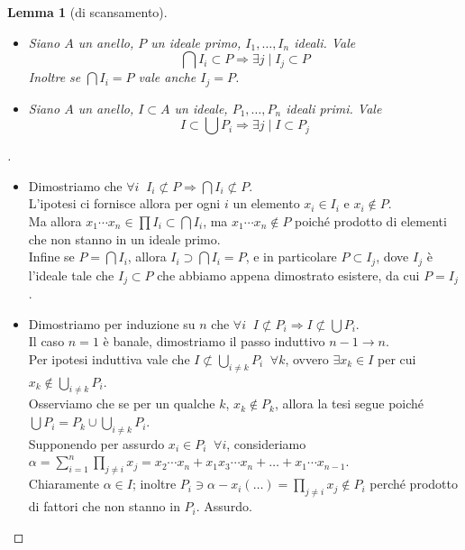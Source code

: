 \documentclass[a4paper,10pt]{article}
\theoremstyle{plain}
\newtheorem{lemma}[thm]{Lemma}
\theoremstyle{definition}
\newenvironment{myproof}[1][\proofname]{%
  \begin{proof}[#1]$ $\par\nobreak\ignorespaces
}{%
  \qedhere
  \end{proof}
}
\begin{document}
\begin{lemma}[di scansamento]
    $ $
    \begin{itemize}
        \item[a)] Siano $A$ un anello, $P$ un ideale primo, $I_1,\dots,I_n$ ideali. Vale $$\bigcap I_i\subset P\Longrightarrow\exists j\;|\;I_j\subset P$$ Inoltre se $\bigcap I_i=P$ vale anche $I_j=P$.
        \item[b)] Siano $A$ un anello, $I\subset A$ un ideale, $P_1,\dots,P_n$ ideali primi. Vale $$I\subset\bigcup P_i\Longrightarrow\exists j\;|\; I\subset P_j$$
    \end{itemize}
\end{lemma}
\begin{myproof}
    \begin{itemize}
        \item[a)] Dimostriamo che $\forall i\;\; I_i\not\subset P\Longrightarrow\bigcap I_i\not\subset P$.\\
        L'ipotesi ci fornisce allora per ogni $i$ un elemento $x_i\in I_i$ e $x_i\not\in P$.\\
        Ma allora $x_1\cdots x_n\in\prod I_i\subset \bigcap I_i$, ma $x_1\cdots x_n\not\in P$ poiché prodotto di elementi che non stanno in un ideale primo.\\
        Infine se $P=\bigcap I_i$, allora $I_i\supset \bigcap I_i=P$, e in particolare $P\subset I_j$, dove $I_j$ è l'ideale tale che $I_j\subset P$ che abbiamo appena dimostrato esistere, da cui $P=I_j$.
        \item[b)] Dimostriamo per induzione su $n$ che $\forall i\;\; I\not\subset P_i \Longrightarrow I\not\subset\bigcup P_i$.\\
        Il caso $n=1$ è banale, dimostriamo il passo induttivo $n-1\rightarrow n$.\\
        Per ipotesi induttiva vale che $I\not\subset\bigcup_{i\neq k}P_i\;\;\forall k$, ovvero $\exists x_k\in I$ per cui $x_k\not\in\bigcup_{i\neq k}P_i$.\\
        Osserviamo che se per un qualche $k$, $x_k\not\in P_k$, allora la tesi segue poiché $\bigcup P_i=P_k\cup\bigcup_{i\neq k}P_i$.\\
        Supponendo per assurdo $x_i\in P_i\;\;\forall i$, consideriamo $\displaystyle\alpha=\sum_{i=1}^n\prod_{j\neq i}x_j=x_2\cdots x_n+x_1x_3\cdots x_n+\dots+x_1\cdots x_{n-1}$.\\
        Chiaramente $\alpha\in I$; inoltre $P_i\ni\alpha-x_i(\dots)=\prod_{j\neq i}x_j\not\in P_i$ perché prodotto di fattori che non stanno in $P_i$. Assurdo.
    \end{itemize}
\end{myproof}
\end{document}
